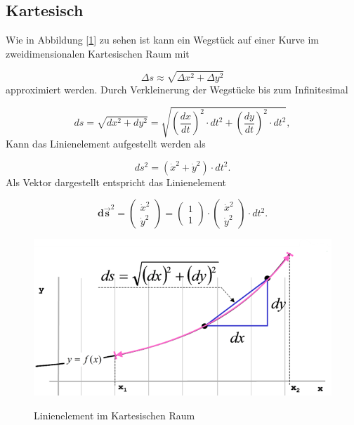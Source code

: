 %
%
%
%
\usepackage{graphicx}
\subsection{Kartesisch\label{geodaeten:section:LinKartesisch}}

Wie in Abbildung [\ref{geodaeten:Linienelemente:figure1}] zu sehen ist kann ein Wegstück auf einer Kurve im zweidimensionalen Kartesischen Raum mit

\begin{equation}
	\Delta s \approx \sqrt{\Delta x^2 + \Delta y^2}
\end{equation}
approximiert werden.
Durch Verkleinerung der Wegstücke bis zum Infinitesimal 

\begin{equation}
	d s = \sqrt{d x^2 + d y^2}
	= \sqrt{\left(\frac{d x}{d t}\right)^2 \cdot d t^2 + \left(\frac{d y}{d t}\right)^2 \cdot d t^2} ,
\end{equation}
Kann das Linienelement aufgestellt werden als

\begin{equation}
 	ds^2 = \left(\dot{x}^2 +\dot{y}^2\right) \cdot dt^2 .
\end{equation}
Als Vektor dargestellt entspricht das Linienelement

\begin{equation}
	\mathbf{d\vec{s}}^2 = \begin{pmatrix} \dot{x}^2 \\ \dot{y}^2 \end{pmatrix} = \begin{pmatrix} 1 \\ 1 \end{pmatrix} \cdot \begin{pmatrix} \dot{x}^2 \\ \dot{y}^2 \end{pmatrix} \cdot dt^2 .
\end{equation}

\begin{figure}
	\centering
	\includegraphics[width=0.7\linewidth]{papers/geodaeten/Abbildungen/Linienelemente/LinKartes1}
	\caption{Linienelement im Kartesischen Raum}
	\label{geodaeten:Linienelemente:figure1}
	\cite{geodaeten:kartesisch}
\end{figure}

